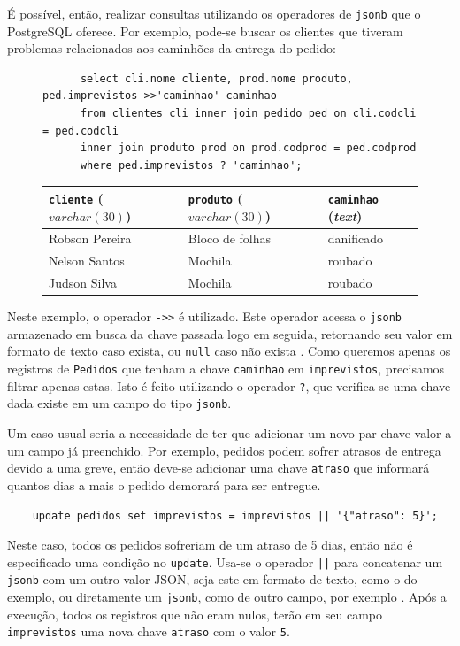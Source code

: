 \documentclass[a4paper, 12pt]{article}
\begin{document}
  É possível, então, realizar consultas utilizando os
  operadores de \verb|jsonb| que o PostgreSQL oferece.
  Por exemplo, pode-se buscar os clientes que tiveram
  problemas relacionados aos caminhões da entrega
  do pedido:
  
  \begin{figure}[h!]
    \centering
    \begin{verbatim}
      select cli.nome cliente, prod.nome produto, ped.imprevistos->>'caminhao' caminhao
      from clientes cli inner join pedido ped on cli.codcli = ped.codcli
      inner join produto prod on prod.codprod = ped.codprod
      where ped.imprevistos ? 'caminhao';
    \end{verbatim}
    \begin{tabular}{lll}
    \toprule
    \texttt{cliente} ($varchar(30)$) & \texttt{produto} ($varchar(30)$) & \texttt{caminhao} (\textit{text}) \\
    \midrule
    Robson Pereira & Bloco de folhas & danificado \\
    Nelson Santos & Mochila & roubado \\
    Judson Silva & Mochila & roubado \\
    \bottomrule
    \end{tabular}
  \end{figure}
  
  Neste exemplo, o operador \verb|->>| é utilizado.
  Este operador acessa o \verb|jsonb| armazenado em busca
  da chave passada logo em seguida, retornando seu valor
  em formato de texto caso exista, ou \verb|null| caso
  não exista \cite{pdfunctionjson}. Como queremos apenas 
  os registros de \verb|Pedidos| que tenham a chave
  \verb|caminhao| em \verb|imprevistos|, precisamos 
  filtrar apenas estas. Isto é feito utilizando o
  operador \verb|?|, que verifica se uma chave dada
  existe em um campo do tipo \verb|jsonb|.
  
  Um caso usual seria a necessidade de ter que adicionar
  um novo par chave-valor a um campo já preenchido.
  Por exemplo, pedidos podem sofrer atrasos de entrega
  devido a uma greve, então deve-se adicionar uma chave
  \verb|atraso| que informará quantos dias a mais
  o pedido demorará para ser entregue.
  
  \begin{verbatim}
    update pedidos set imprevistos = imprevistos || '{"atraso": 5}';
  \end{verbatim}
  
  Neste caso, todos os pedidos sofreriam de um atraso
  de 5 dias, então não é especificado uma condição
  no \verb|update|. Usa-se o operador \texttt{||} para
  concatenar um \verb|jsonb| com um outro valor JSON,
  seja este em formato de texto, como o do exemplo, ou
  diretamente um \verb|jsonb|, como de outro campo, por
  exemplo \cite{huchet17}. Após a execução, todos os
  registros que não eram nulos, terão em seu campo
  \verb|imprevistos| uma nova chave \verb|atraso| 
  com o valor \verb|5|.
  
\end{document}
